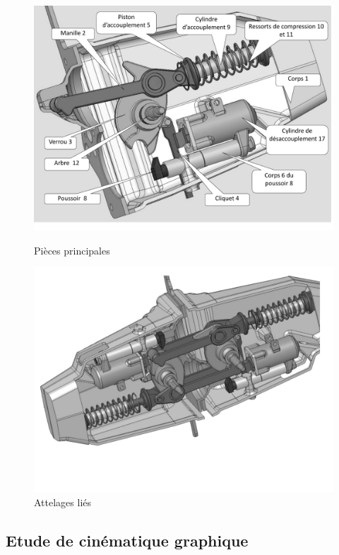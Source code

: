 \begin{figure}[!h]
 \begin{minipage}{0.5\linewidth}
\centering\includegraphics[width=\linewidth]{img/Image3.pdf}
 \caption{Pièces principales}
 \label{img:image3}
 \end{minipage}
\hfill
 \begin{minipage}{0.49\linewidth}
\centering\includegraphics[width=\linewidth]{img/Image4.pdf}
 \caption{Attelages liés}
 \label{img:image4}
 \end{minipage}
\end{figure}

\subsection{Etude de cinématique graphique}

